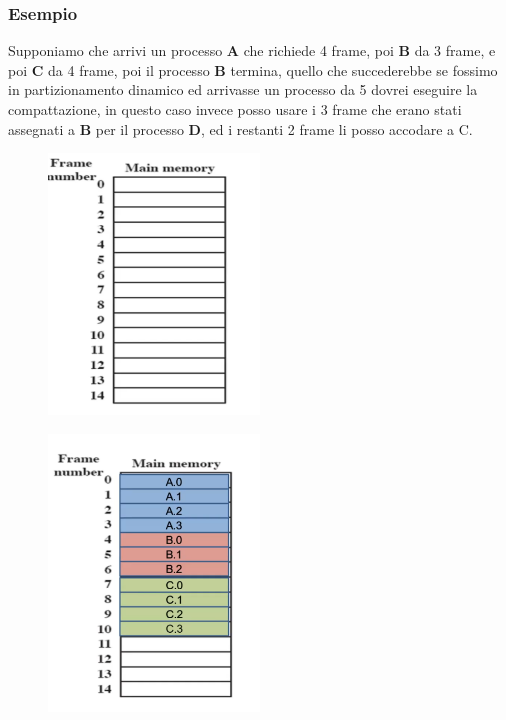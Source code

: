     \subsubsection*{Esempio}
    Supponiamo che arrivi un processo \textbf{A} che richiede 4 frame, poi \textbf{B} da 3 frame, e poi \textbf{C} da
    4 frame, poi il processo \textbf{B } termina, quello che succederebbe se fossimo in partizionamento dinamico ed
    arrivasse un processo da 5 dovrei eseguire la compattazione, in questo caso invece posso usare i 3 frame che
    erano stati assegnati a \textbf{B} per il processo \textbf{D}, ed i restanti 2 frame li posso accodare a C.
    \begin{figure}[H]
        \centering
        \includegraphics[width=0.5\textwidth]{immagini/PaginazioneEsempio1}
    \end{figure}
    \begin{figure}[H]
        \centering
        \includegraphics[width=0.5\textwidth]{immagini/PaginazioneEsempio1and2}
    \end{figure}
